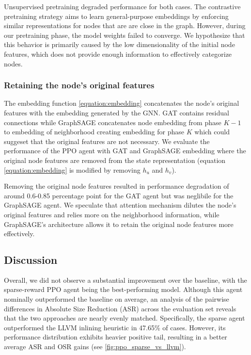 \documentclass{article}
\theoremstyle{plain}
\theoremstyle{definition}
\theoremstyle{remark}
\begin{document}
Unsupervised pretraining degraded performance for both cases. The contrastive pretraining strategy aims to learn general-purpose embeddings by enforcing similar representations for nodes that are are close in the graph. However, during our pretraining phase, the model weights failed to converge. We hypothesize that this behavior is primarily caused by the low dimensionality of the initial node features, which does not provide enough information to effectively categorize nodes.

\subsubsection{Retaining the node's original features}

The embedding function \ref{equation:embedding} concatenates the node's original features with the embedding generated by the GNN. GAT contains residual connections while GraphSAGE concatenates node embedding from phase $K-1$ to embedding of neighborhood creating embedding for phase $K$ which could suggeset that the original features are not necessary. We evaluate the performance of the PPO agent with GAT and GraphSAGE embedding where the original node features are removed from the state representation (equation \ref{equation:embedding} is modified by removing $h_u$ and $h_v$).

Removing the original node features resulted in performance degradation of around 0.6-0.85 percentage point for the GAT agent but was neglibile for the GraphSAGE agent. We speculate that attention mechanism dilutes the node's original features and relies more on the neighborhood information, while GraphSAGE's architecture allows it to retain the original node features more effectively.

\subsection{Discussion}

Overall, we did not observe a substantial improvement over the baseline, with the sparse-reward PPO agent being the best-performing model. Although this agent nominally outperformed the baseline on average, an analysis of the pairwise differences in Absolute Size Reduction (ASR) across the evaluation set reveals that the two approaches are nearly evenly matched. Specifically, the sparse agent outperformed the LLVM inlining heuristic in 47.65\% of cases. However, its performance distribution exhibits heavier positive tail, resulting in a better average ASR and OSR gains (see \cref{fig:ppo_sparse_vs_llvm}).
\end{document}

